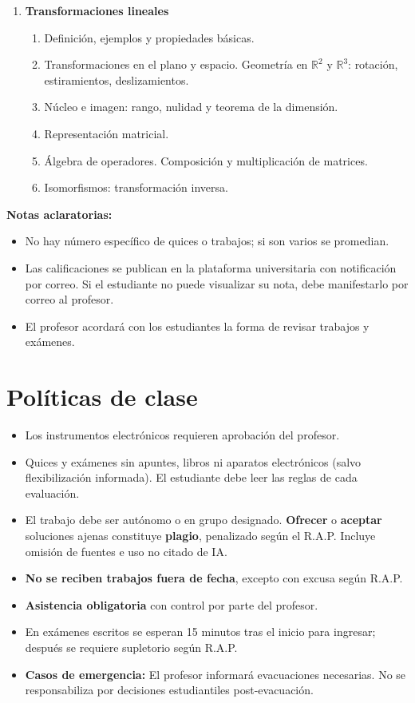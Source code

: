 \begin{enumerate}
\item \textbf{Transformaciones lineales}
\begin{enumerate}[$a)$]
\item Definición, ejemplos y propiedades básicas.
\item Transformaciones en el plano y espacio. Geometría en $\mathbb{R}^2$ y $\mathbb{R}^3$: rotación, estiramientos, deslizamientos.
\item Núcleo e imagen: rango, nulidad y teorema de la dimensión.
\item Representación matricial.
\item Álgebra de operadores. Composición y multiplicación de matrices.
\item Isomorfismos: transformación inversa.
\end{enumerate}
\end{enumerate}

\textbf{Notas aclaratorias:}
\begin{itemize}
\item No hay número específico de quices o trabajos; si son varios se promedian.
\item Las calificaciones se publican en la plataforma universitaria con notificación por correo. Si el estudiante no puede visualizar su nota, debe manifestarlo por correo al profesor.
\item El profesor acordará con los estudiantes la forma de revisar trabajos y exámenes.
\end{itemize}

\section{Políticas de clase}

\begin{itemize}
\item Los instrumentos electrónicos requieren aprobación del profesor.

\item Quices y exámenes sin apuntes, libros ni aparatos electrónicos (salvo flexibilización informada). El estudiante debe leer las reglas de cada evaluación.

\item El trabajo debe ser autónomo o en grupo designado. \textbf{Ofrecer} o \textbf{aceptar} soluciones ajenas constituye \textbf{plagio}, penalizado según el R.A.P. Incluye omisión de fuentes e uso no citado de IA.

\item \textbf{No se reciben trabajos fuera de fecha}, excepto con excusa según R.A.P.

\item \textbf{Asistencia obligatoria} con control por parte del profesor.

\item En exámenes escritos se esperan 15 minutos tras el inicio para ingresar; después se requiere supletorio según R.A.P.

\item \textbf{Casos de emergencia:} El profesor informará evacuaciones necesarias. No se responsabiliza por decisiones estudiantiles post-evacuación.
\end{itemize}